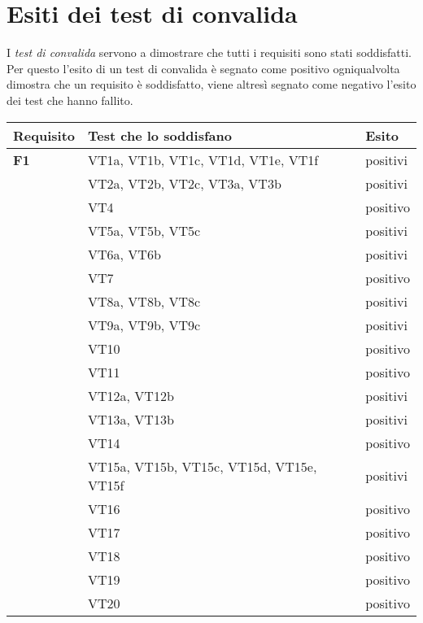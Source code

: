 \chapter{Esiti dei test di convalida}
I \textit{test di convalida} servono a dimostrare che tutti i requisiti sono stati soddisfatti. Per questo l'esito di un test di convalida \`e segnato come positivo ogniqualvolta dimostra che un requisito \`e soddisfatto, viene altres\`i segnato come negativo l'esito dei test che hanno fallito. 
 \begin{center}
\begin{tabular}{|p{2cm}|p{7cm}|p{2cm}|} \hline
\textbf{Requisito} & \textbf{Test che lo soddisfano} & \textbf{Esito}\\ \hline
\textbf{F1}  & VT1a, VT1b, VT1c, VT1d, VT1e, VT1f & positivi\\ \cline{2-3}
& VT2a, VT2b, VT2c, VT3a, VT3b & positivi\\ \cline{2-3}
& VT4 & positivo\\ \cline{2-3}
& VT5a, VT5b, VT5c & positivi\\ \cline{2-3}
&  VT6a, VT6b & positivi\\ \cline{2-3}
&  VT7 & positivo\\ \cline{2-3}
&  VT8a, VT8b, VT8c & positivi\\ \cline{2-3}
&  VT9a, VT9b, VT9c & positivi\\ \cline{2-3}
&  VT10 & positivo\\ \cline{2-3}
&  VT11 & positivo\\ \cline{2-3}
&  VT12a, VT12b & positivi\\ \cline{2-3}
&  VT13a, VT13b & positivi\\ \cline{2-3}
&  VT14 & positivo\\ \cline{2-3}
&  VT15a, VT15b, VT15c, VT15d, VT15e, VT15f & positivi\\ \cline{2-3}
&  VT16 & positivo\\ \cline{2-3}
&  VT17 & positivo\\ \cline{2-3}
&  VT18 & positivo\\ \cline{2-3}
&  VT19 & positivo\\ \cline{2-3}
&  VT20 & positivo\\ \hline
\end{tabular} \\
\end{center}

